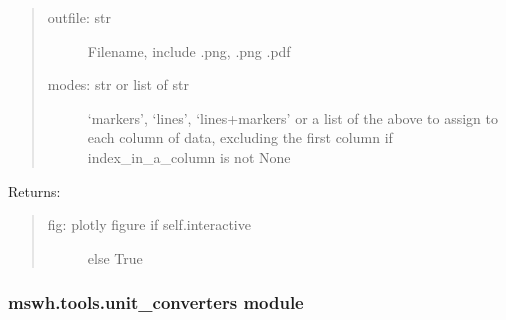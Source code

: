 \documentclass[letterpaper,10pt,english,openany]{sphinxmanual}
\begin{document}
\begin{fulllineitems}
\begin{fulllineitems}
\begin{quote}
\begin{description}
\item[{outfile: str}] \leavevmode
Filename, include .png, .png .pdf

\item[{modes: str or list of str}] \leavevmode
‘markers’, ‘lines’, ‘lines+markers’ or
a list of the above to assign to each column
of data, excluding the first column if
index\_in\_a\_column is not None

\end{description}
\end{quote}

Returns:
\begin{quote}
\begin{description}
\item[{fig: plotly figure if self.interactive}] \leavevmode
else True

\end{description}
\end{quote}

\end{fulllineitems}


\end{fulllineitems}



\subsubsection{mswh.tools.unit\_converters module}
\label{\detokenize{source/mswh.tools:module-mswh.tools.unit_converters}}\label{\detokenize{source/mswh.tools:mswh-tools-unit-converters-module}}
\end{document}
